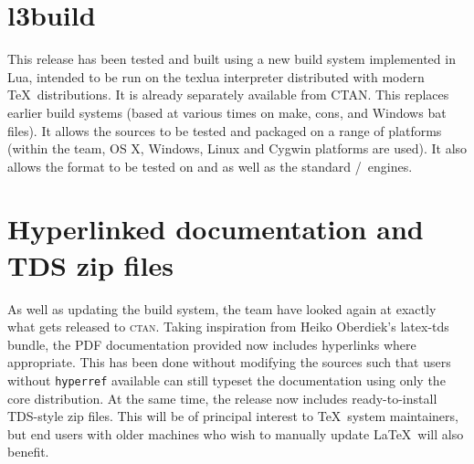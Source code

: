 \documentclass{ltnews}
\providecommand\pkg[1]{\texttt{#1}}
\begin{document}
\section{l3build}

This release has been tested and built using a new build system implemented in
\textsf{Lua}, intended to be run on the \textsf{texlua} interpreter distributed
with modern \TeX\ distributions. It is already separately available
from CTAN. This replaces earlier build systems (based at various times on
\textsf{make}, \textsf{cons}, and Windows \textsf{bat} files). It allows the
sources to be tested and packaged on a range of platforms (within the team,
OS X, Windows, Linux and Cygwin platforms are used). It also allows the
format to be tested on  and  as well as the
standard /\eTeX\ engines.

\section{Hyperlinked documentation and TDS zip files}

As well as updating the build system, the team have looked again at exactly
what gets released to \textsc{ctan}. Taking inspiration from Heiko Oberdiek's
\textsf{latex-tds} bundle, the PDF documentation provided now includes
hyperlinks where appropriate. This has been done without modifying the sources
such that users without \pkg{hyperref} available can still typeset the
documentation using only the core distribution. At the same time, the release
now includes ready-to-install TDS-style zip files. This will be of principal
interest to \TeX\ system maintainers, but end users with older machines who
wish to manually update \LaTeX\ will also benefit.
\end{document}
